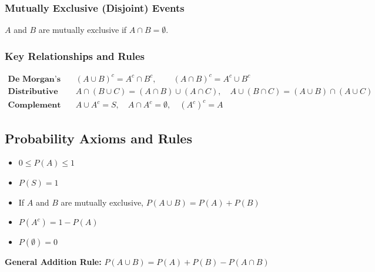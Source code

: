 \documentclass[11pt]{article}
\begin{document}
\subsubsection*{Mutually Exclusive (Disjoint) Events}
\(A\) and \(B\) are mutually exclusive if \(A \cap B = \emptyset\).

\begin{center}
\end{center}

\subsubsection*{Key Relationships and Rules}
\begin{align*}
    \textbf{De Morgan's Laws:}&\quad (A \cup B)^c = A^c \cap B^c,\qquad (A \cap B)^c = A^c \cup B^c\\
    \textbf{Distributive Laws:}&\quad A \cap (B \cup C) = (A \cap B) \cup (A \cap C),\quad A \cup (B \cap C) = (A \cup B) \cap (A \cup C)\\
    \textbf{Complement Laws:}&\quad A \cup A^c = S,\quad A \cap A^c = \emptyset,\quad (A^c)^c = A
\end{align*}

\subsection*{Probability Axioms and Rules}
\begin{itemize}[nosep]
    \item \(0 \leq P(A) \leq 1\)
    \item \(P(S) = 1\)
    \item If \(A\) and \(B\) are mutually exclusive, \(P(A \cup B) = P(A) + P(B)\)
    \item \(P(A^c) = 1 - P(A)\)
    \item \(P(\emptyset) = 0\)
\end{itemize}

\textbf{General Addition Rule:} \(P(A \cup B) = P(A) + P(B) - P(A \cap B)\)

\begin{center}
\end{center}
\end{document}
